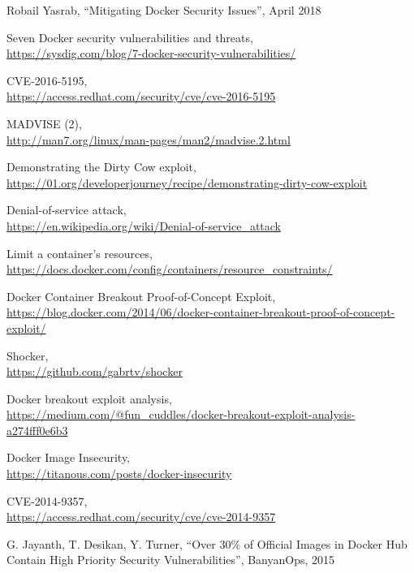 \documentclass[a4paper,12pt]{article}
\begin{document}
\begin{thebibliography}{99}
Robail Yasrab,
``Mitigating Docker Security Issues'',
April 2018

Seven Docker security vulnerabilities and threats,\\ \url{https://sysdig.com/blog/7-docker-security-vulnerabilities/}

CVE-2016-5195,\\ \url{https://access.redhat.com/security/cve/cve-2016-5195} 

MADVISE (2), \\ \url{http://man7.org/linux/man-pages/man2/madvise.2.html}

Demonstrating the Dirty Cow exploit, \\ \url{https://01.org/developerjourney/recipe/demonstrating-dirty-cow-exploit}

Denial-of-service attack, \\
\url{https://en.wikipedia.org/wiki/Denial-of-service_attack}

Limit a container's resources, \\ \url{https://docs.docker.com/config/containers/resource_constraints/}

Docker Container Breakout Proof-of-Concept Exploit, \\ \url{https://blog.docker.com/2014/06/docker-container-breakout-proof-of-concept-exploit/}

Shocker, \\ \url{https://github.com/gabrtv/shocker}

Docker breakout exploit analysis, \\ \url{https://medium.com/@fun_cuddles/docker-breakout-exploit-analysis-a274fff0e6b3}

Docker Image Insecurity, \\ \url{https://titanous.com/posts/docker-insecurity}

CVE-2014-9357, \\ \url{https://access.redhat.com/security/cve/cve-2014-9357}

G. Jayanth, T. Desikan, Y. Turner, ``Over 30\% of Official Images in Docker
Hub Contain High Priority Security Vulnerabilities'', BanyanOps, 2015


\end{thebibliography}
\end{document}
